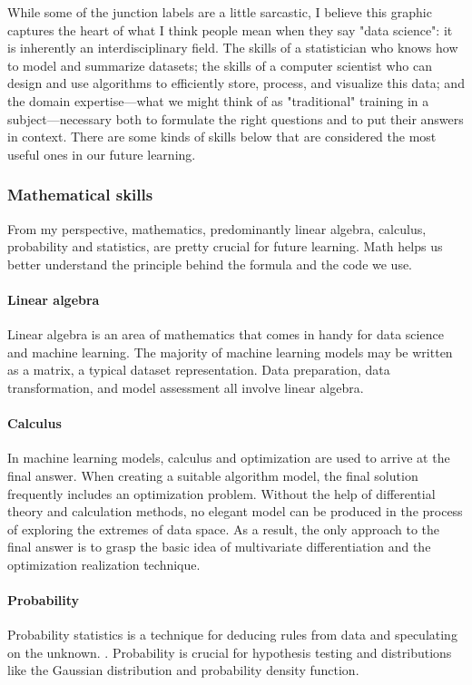 \documentclass[a4paper, 11pt]{report}
\begin{document}
While some of the junction labels are a little sarcastic, I believe this graphic captures the heart of what I think people mean when they say "data science": it is inherently an interdisciplinary field. The skills of a statistician who knows how to model and summarize datasets; the skills of a computer scientist who can design and use algorithms to efficiently store, process, and visualize this data; and the domain expertise—what we might think of as "traditional" training in a subject—necessary both to formulate the right questions and to put their answers in context. \cite{(Vanderplas, 2017)} There are some kinds of skills below that are considered the most useful ones in our future learning.\\

\subsubsection{Mathematical skills}
From my perspective, mathematics, predominantly linear algebra, calculus, probability and statistics, are pretty crucial for future learning. Math helps us better understand the principle behind the formula and the code we use.\\
\paragraph{Linear algebra}
Linear algebra is an area of mathematics that comes in handy for data science and machine learning. The majority of machine learning models may be written as a matrix, a typical dataset representation. Data preparation, data transformation, and model assessment all involve linear algebra. \cite{(Benjamin Obi Tayo, Ph.D., 2021)}\\
\paragraph{Calculus}
In machine learning models, calculus and optimization are used to arrive at the final answer. When creating a suitable algorithm model, the final solution frequently includes an optimization problem. Without the help of differential theory and calculation methods, no elegant model can be produced in the process of exploring the extremes of data space. As a result, the only approach to the final answer is to grasp the basic idea of multivariate differentiation and the optimization realization technique. \cite{(Zhang, 2020)}\\
\paragraph{Probability}
Probability statistics is a technique for deducing rules from data and speculating on the unknown. \cite{(Zhang, 2020)}. Probability is crucial for hypothesis testing and distributions like the Gaussian distribution and probability density function. \cite{(Ronald Van Loon, 2020)}\\
\end{document}
